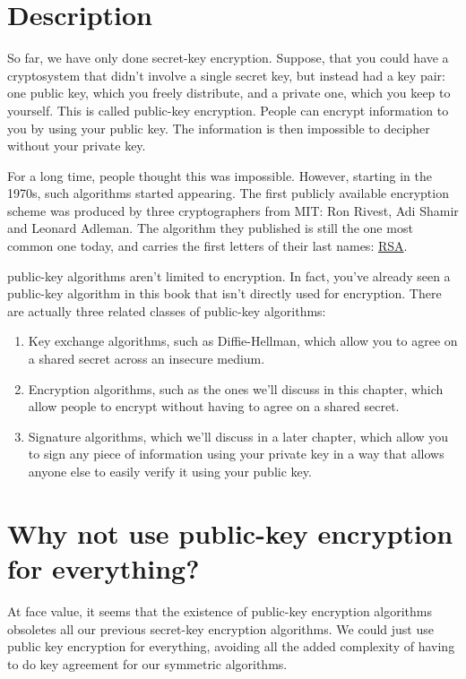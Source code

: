 \documentclass[11pt,ebook,table,dvipsnames]{memoir}
\begin{document}
\section{Description}
\label{sec-2-5-1}

So far, we have only done \gls{secret-key encryption}. Suppose, that
you could have a cryptosystem that didn't involve a single secret key,
but instead had a key pair: one public key, which you freely
distribute, and a private one, which you keep to yourself. This is
called \gls{public-key encryption}. People can encrypt information to
you by using your public key. The information is then impossible to
decipher without your private key.

For a long time, people thought this was impossible. However, starting
in the 1970s, such algorithms started appearing. The first publicly
available encryption scheme was produced by three cryptographers from
MIT: Ron Rivest, Adi Shamir and Leonard Adleman. The algorithm they
published is still the one most common one today, and carries the
first letters of their last names: \hyperref[RSA]{RSA}.

\Glspl{public-key algorithm} aren't limited to encryption. In fact,
you've already seen a public-key algorithm in this book that isn't
directly used for encryption. There are actually three related classes
of public-key algorithms:

\begin{enumerate}
\item Key exchange algorithms, such as Diffie-Hellman, which allow you
to agree on a shared secret across an insecure medium.
\item Encryption algorithms, such as the ones we'll discuss in this
chapter, which allow people to encrypt without having to agree on
a shared secret.
\item Signature algorithms, which we'll discuss in a later chapter, which
allow you to sign any piece of information using your private key
in a way that allows anyone else to easily verify it using your
public key.
\end{enumerate}
\section{Why not use public-key encryption for everything?}
\label{sec-2-5-2}

At face value, it seems that the existence of
\gls{public-key encryption} algorithms obsoletes all our previous
\gls{secret-key encryption} algorithms. We could just use public
key encryption for everything, avoiding all the added complexity
of having to do key agreement for our symmetric algorithms.
\end{document}
